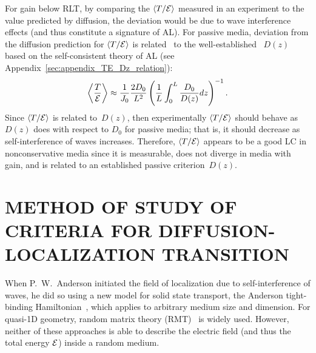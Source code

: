 For gain below RLT, by comparing the $\langle T / {\cal E} \rangle $ measured in an experiment to the value predicted by diffusion, the deviation would be due to wave interference effects (and thus constitute a signature of AL). For passive media, deviation from the diffusion prediction for $\langle T / {\cal E} \rangle $ is related~\cite{2010_Payne_TE} to the well-established~\cite{2008_Cherroret} $D(z)$ based on the self-consistent theory of AL (see Appendix~\ref{sec:appendix_TE_Dz_relation}):
\begin{equation}
\left\langle \frac{ T }{{\cal E}}\right\rangle \approx \frac{1}{J_0} \frac{2 D_0}{L^2} \left(\frac{1}{L} \int_0^L \frac{D_0}{D(z)} dz \right)^{-1}.
\label{eq:TE_related_Dz}
\end{equation}
Since $\langle T /{\cal E}\rangle$ is related to~$D(z)$, then experimentally $\langle T /{\cal E}\rangle$ should behave as $D(z)$ does with respect to $D_0$ for passive media; that is, it should decrease as self-interference of waves increases. Therefore, $\langle T /{\cal E}\rangle$ appears to be a good LC in nonconservative media since it is measurable, does not diverge in media with gain, and is related to an established passive criterion~$D(z)$.


\section{METHOD OF STUDY OF CRITERIA FOR DIFFUSION- LOCALIZATION TRANSITION}
\label{sec:method_numerical}

When P.~W.~Anderson initiated the field of localization due to self-interference of waves, he did so using a new model for solid state transport, the Anderson tight-binding Hamiltonian~\cite{1958_Anderson}, which applies to arbitrary medium size and dimension. For quasi-1D geometry, random matrix theory (RMT)~\cite{1951_Wigner,1997_Beenakker,2009_Beenakker} %
is widely used. However, neither of these approaches is able to describe the electric field (and thus the total energy ${\cal E}$) inside a random medium.

